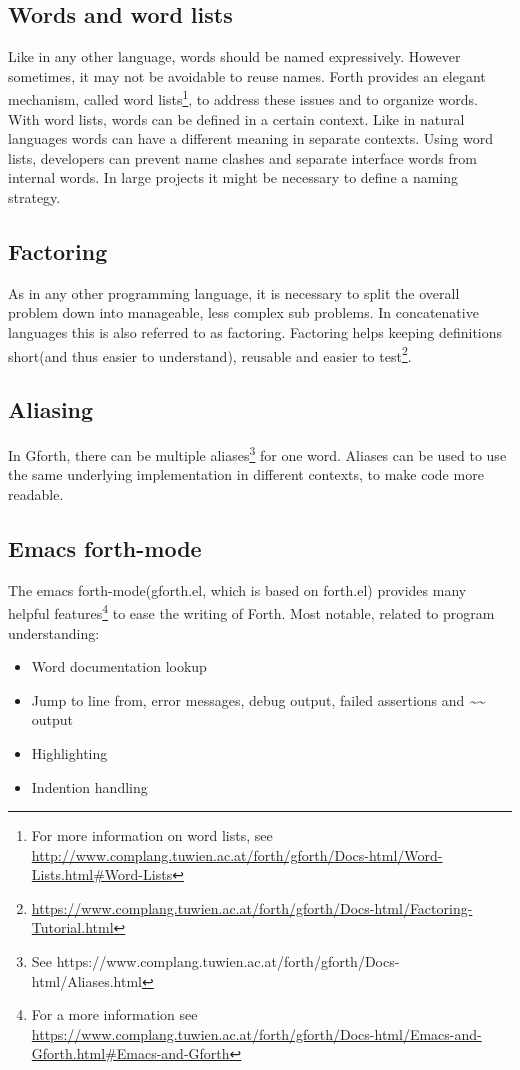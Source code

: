 \subsection*{Words and word lists}
Like in any other language, words should be named expressively. However sometimes, it may not be avoidable to reuse names. Forth provides an elegant mechanism, called word lists\footnote{For more information on word lists, see \url{http://www.complang.tuwien.ac.at/forth/gforth/Docs-html/Word-Lists.html\#Word-Lists}}, to address these issues and to organize words. With word lists, words can be defined in a certain context. Like in natural languages words can have a different meaning in separate contexts. Using word lists, developers can prevent name clashes and separate interface words from internal words. In large projects it might be necessary to define a naming strategy.

\subsection*{Factoring}
As in any other programming language, it is necessary to split the overall problem down into manageable, less complex sub problems. In concatenative languages this is also referred to as factoring. Factoring helps keeping definitions short(and thus easier to understand), reusable and easier to test\footnote{\url{https://www.complang.tuwien.ac.at/forth/gforth/Docs-html/Factoring-Tutorial.html}}.

\subsection*{Aliasing}
In Gforth, there can be multiple aliases\footnote{See https://www.complang.tuwien.ac.at/forth/gforth/Docs-html/Aliases.html} for one word. Aliases can be used to use the same underlying implementation in different contexts, to make code more readable.

\subsection*{Emacs forth-mode}

The emacs forth-mode(gforth.el, which is based on forth.el) provides many helpful features\footnote{For a more information see \url{https://www.complang.tuwien.ac.at/forth/gforth/Docs-html/Emacs-and-Gforth.html\#Emacs-and-Gforth}} to ease the writing of Forth. Most notable, related to program understanding:
\begin{itemize}
\item Word documentation lookup
\item Jump to line from, error messages, debug output, failed assertions and \emph{\textasciitilde\textasciitilde} output
\item Highlighting
\item Indention handling
\end{itemize}

